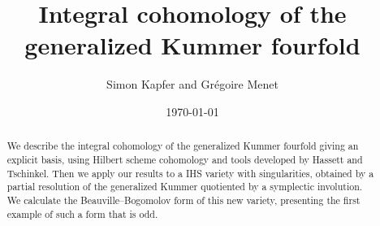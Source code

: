 \documentclass[a4paper]{article}
\begin{document}
\title{\bf Integral cohomology of the generalized Kummer fourfold}


\author{Simon Kapfer and Gr\'egoire Menet}


\date{\today}

\maketitle
\begin{abstract}
We describe the integral cohomology of the generalized Kummer fourfold giving an explicit basis, using Hilbert scheme cohomology and tools developed by Hassett and Tschinkel.
Then we apply our results to a IHS variety with singularities, obtained by a partial resolution of the generalized Kummer quotiented by a symplectic involution. 
We calculate the Beauville--Bogomolov form of this new variety, presenting the first example of such a form that is odd.
\end{abstract}


%
%
%
%



%



\appendix


\end{document}
